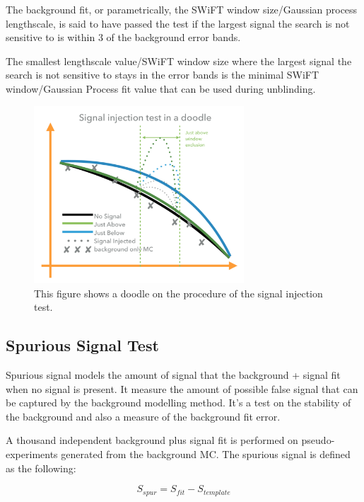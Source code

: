    
   The background fit, or parametrically, the SWiFT window size/Gaussian process lengthscale, is said to have passed the test if the largest signal the search is not sensitive to is within 3 \sigma of the background error bands. 

   The smallest lengthscale value/SWiFT window size where the largest signal the search is not sensitive to stays in the error bands is the minimal SWiFT window/Gaussian Process fit value that can be used during unblinding. 

\begin{figure}[!htb]
    \begin{center}
        \includegraphics[width=0.7\textwidth]{figures/chapter_analysismethod/SignalInjectionTest}
        \caption{
            This figure shows a doodle on the procedure of the signal injection test.
        }
        \label{signalinjection}
    \end{center}
\end{figure}

    \subsection{Spurious Signal Test} 
    Spurious signal models the amount of signal that the background + signal fit when no signal is present. It measure the amount of possible false signal that can be captured by the background modelling method. It's a test on the stability of the background and also a measure of the background fit error\cite{}.

    A thousand independent background plus signal fit is performed on pseudo-experiments generated from the background MC. The spurious signal is defined as the following:
    
    \begin{equation}
        S_{spur} = S_{fit} - S_{template}
    \end{equation}

